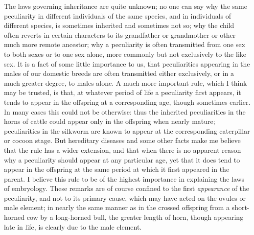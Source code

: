 \indent The laws governing inheritance are quite unknown; no one can say why the same peculiarity in different individuals of the same species, and in individuals of different species, is sometimes inherited and sometimes not so; why the child often reverts in certain characters to its grandfather or grandmother or other much more remote ancestor; why a peculiarity is often transmitted from one sex to both sexes or to one sex alone, more commonly but not exclusively to the like sex. It is a fact of some little importance to us, that peculiarities appearing in the males of our domestic breeds are often transmitted either exclusively, or in a much greater degree, to males alone. A much more important rule, which I think may be trusted, is that, at whatever period of life a peculiarity first appears, it tends to appear in the offspring at a corresponding age, though sometimes earlier. In many cases this could not be otherwise: thus the inherited peculiarities in the horns of cattle could appear only in the offspring when nearly mature; peculiarities in the silkworm are known to appear at the corresponding caterpillar or cocoon stage. But hereditary diseases and some other facts make me believe that the rule has a wider extension, and that when there is no apparent reason why a peculiarity should appear at any particular age, yet that it does tend to appear in the offspring at the same period at which it first appeared in the parent. I believe this rule to be of the highest importance in explaining the laws of embryology. These remarks are of course confined to the first \emph{appearance} of the peculiarity, and not to its primary cause, which may have acted on the ovules or male element; in nearly the same manner as in the crossed offspring from a short-horned cow by a long-horned bull, the greater length of horn, though appearing late in life, is clearly due to the male element.  \\
